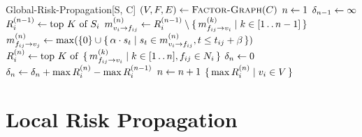 %
\begin{function}{Global-Risk-Propagation}[S, C]
\State $(\vVariables, \vFactors, \vEdges) \assign \Call{Factor-Graph}{C}$
\State $n \leftarrow 1$
\State $\delta_{n - 1} \leftarrow \infty$
	\State $R_{i}^{(n - 1)} \leftarrow \text{top } K \text{ of } S_i$
\EndFor
{}
		\State $m_{v_{i} \rightarrow f_{ij}}^{(n)} \leftarrow R_{i}^{(n - 1)} \setminus \set{ m_{f_{ij} \rightarrow v_{i}}^{(k)} | k \in [1 \mathinner {\ldotp \ldotp}n - 1]}$
	\EndFor
		\State $m_{f_{ij} \rightarrow v_{j}}^{(n)} \leftarrow \max (\{0\} \cup \set{ \alpha\cdot s_t| s_t\in m_{v_{i} \rightarrow f_{ij}}^{(n)}, t\leq t_{ij} + \beta})$
	\EndFor
		\State $R_{i}^{(n)} \leftarrow \text{top } K \text{ of } \set{ m_{f_{ij} \rightarrow v_{i}}^{(k)} | k \in [1 \mathinner {\ldotp \ldotp}n], f_{ij} \in N_i}$
	\EndFor
	\State $\delta_{n} \leftarrow 0$
		\State $\delta_{n} \leftarrow \delta_{n} + \max R_{i}^{(n)} - \max R_{i}^{(n - 1)}$
	\EndFor
	\State $n \leftarrow n + 1$
\EndWhile
\State \Return $\set{ \max R_{i}^{(n)} | v_{i} \in V}$
\end{function}

\section{Local Risk Propagation}\label{sec:vertices-to-actors}

